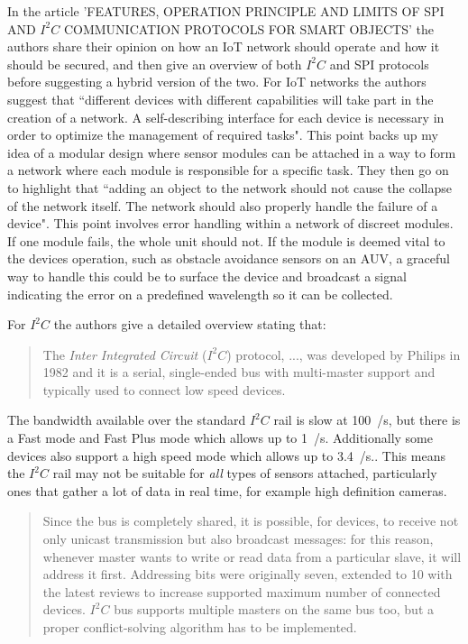\documentclass[11pt,a4paper,titlepage]{report}
\begin{document}
	In the article 'FEATURES, OPERATION PRINCIPLE AND LIMITS OF SPI AND $I^{2}C$ COMMUNICATION PROTOCOLS FOR SMART OBJECTS' the authors share their opinion on how an IoT network should operate and how it should be secured, and then give an overview of both $I^{2}C$ and SPI protocols before suggesting a hybrid version of the two. For IoT networks the authors suggest that ``different devices with different capabilities will take part in the creation of a network. A self-describing interface for each device is necessary in order to optimize the management of required tasks"\cite{I2C}. This point backs up my idea of a modular design where sensor modules can be attached in a way to form a network where each module is responsible for a specific task. They then go on to highlight that ``adding an object to the network should not cause the collapse of the network itself. The network should also properly handle the failure of a device"\cite{I2C}. This point involves error handling within a network of discreet modules. If one module fails, the whole unit should not. If the module is deemed vital to the devices operation, such as obstacle avoidance sensors on an AUV, a graceful way to handle this could be to surface the device and broadcast a signal indicating the error on a predefined wavelength so it can be collected. 
	
	For $I^{2}C$ the authors give a detailed overview stating that:
	
	\begin{quote}
		The \textit{Inter Integrated Circuit} ($I^{2}C$) protocol, ..., was developed by Philips in 1982 and it is a serial, single-ended bus with multi-master support and typically used to connect low speed devices.\cite{I2C}
	\end{quote}
	
	The bandwidth available over the standard $I^{2}C$ rail is slow at 100\unit{\kilo\bit}/\unit{\second}, but there is a Fast mode and Fast Plus mode which allows up to 1\unit{\mega\bit}/\unit{\second}. Additionally some devices also support a high speed mode which allows up to 3.4\unit{\mega\bit}/\unit{\second}.\cite{I2C_FAST}. This means the $I^{2}C$ rail may not be suitable for \textit{all} types of sensors attached, particularly ones that gather a lot of data in real time, for example high definition cameras. 
	
	\begin{quote}
		Since the bus is completely shared, it is possible, for devices, to receive not only unicast transmission but also broadcast messages: for this reason, whenever master wants to write or read data from a particular slave, it will address it first. Addressing bits were originally seven, extended to 10 with the latest reviews to increase supported maximum number of connected devices. $I^{2}C$ bus supports multiple masters on the same bus too, but a proper conflict-solving algorithm has to be implemented. \cite{I2C}
	\end{quote}
	
\end{document}
